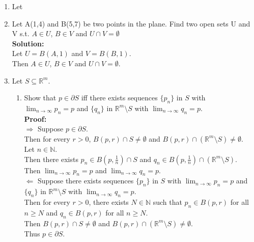\documentclass{article}
\begin{document}
\begin{enumerate} \boldmath
    \item Let 
    \item Let A(1,4) and B(5,7) be two points in the plane. Find two open sets U and V s.t.
$A \in U$, $B \in V$ and $U \cap V = \emptyset$\\ 

\textbf{Solution:} \\

Let $U = B(A,1)$ and $V = B(B,1)$. \\
Then $A \in U$, $B \in V$ and $U \cap V = \emptyset$.\\


    \item  Let $S \subseteq \mathbb{R}^m$.\\
    \begin{enumerate}

        \item  Show that
$p \in \partial S$ iff there exists sequences $\{p_n\}$ in $S$ with $\lim_{n\to \infty}  p_n = p$ and $\{q_n\}$ in $\mathbb{R}^m \setminus S$ with $\lim_{n\to \infty} q_n = p$. \\

\textbf{Proof:} \\

$\Rightarrow$ Suppose $p \in \partial S$. \\
Then for every $r > 0$, $B(p,r) \cap S \neq \emptyset$ and $B(p,r) \cap (\mathbb{R}^m \setminus S) \neq \emptyset$. \\
Let $n \in \mathbb{N}$. \\
Then there exists $p_n \in B(p, \frac{1}{n}) \cap S$ and $q_n \in B(p, \frac{1}{n}) \cap (\mathbb{R}^m \setminus S)$. \\ 
Then $\lim_{n\to \infty} p_n = p$ and $\lim_{n\to \infty} q_n = p$.\\

$\Leftarrow$ Suppose there exists sequences $\{p_n\}$ in $S$ with $\lim_{n\to \infty}  p_n = p$ and $\{q_n\}$ in $\mathbb{R}^m \setminus S$ with $\lim_{n\to \infty} q_n = p$. \\ Then for every $r > 0$, there exists $N \in \mathbb{N}$ such that $p_n \in B(p,r)$ for all $n \geq N$ and $q_n \in B(p,r)$ for all $n \geq N$. \\ Then $B(p,r) \cap S \neq \emptyset$ and $B(p,r) \cap (\mathbb{R}^m \setminus S) \neq \emptyset$. \\ Thus $p \in \partial S$.\\


\end{enumerate}
\end{enumerate}
\end{document}

